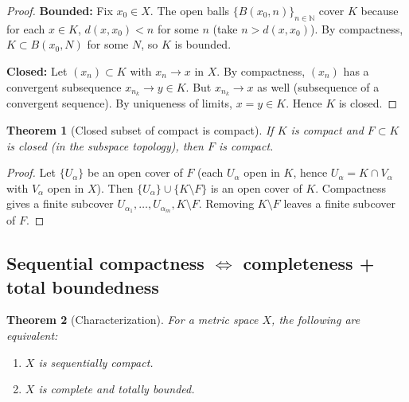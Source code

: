 \documentclass[11pt]{article}
\newtheorem{theorem}{Theorem}[section]
\theoremstyle{definition}
\newcommand{\N}{\mathbb{N}}
\begin{document}
\begin{proof}
\textbf{Bounded:} Fix $x_0\in X$. The open balls $\{B(x_0,n)\}_{n\in\N}$ cover $K$ because for each $x\in K$, $d(x,x_0)<n$ for some $n$ (take $n>\!d(x,x_0)$).
By compactness, $K\subset B(x_0,N)$ for some $N$, so $K$ is bounded.

\textbf{Closed:} Let $(x_n)\subset K$ with $x_n\to x$ in $X$. By compactness, $(x_n)$ has a convergent subsequence $x_{n_k}\to y\in K$.
But $x_{n_k}\to x$ as well (subsequence of a convergent sequence).
By uniqueness of limits, $x=y\in K$. Hence $K$ is closed.
\end{proof}

\begin{theorem}[Closed subset of compact is compact]
If $K$ is compact and $F\subset K$ is closed (in the subspace topology), then $F$ is compact.
\end{theorem}

\begin{proof}
Let $\{U_\alpha\}$ be an open cover of $F$ (each $U_\alpha$ open in $K$, hence $U_\alpha=K\cap V_\alpha$ with $V_\alpha$ open in $X$).
Then $\{U_\alpha\}\cup\{K\setminus F\}$ is an open cover of $K$.
Compactness gives a finite subcover $U_{\alpha_1},\dots,U_{\alpha_m},K\setminus F$.
Removing $K\setminus F$ leaves a finite subcover of $F$.
\end{proof}

\subsection{Sequential compactness $\Leftrightarrow$ completeness + total boundedness}

\begin{theorem}[Characterization]
For a metric space $X$, the following are equivalent:
\begin{enumerate}[label=\textbf{(\arabic*)}]
\item $X$ is sequentially compact.
\item $X$ is complete and totally bounded.
\end{enumerate}
\end{theorem}
\end{document}
